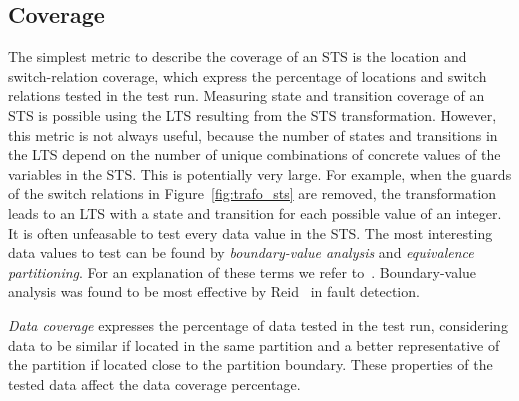 \subsection{Coverage}\label{sec:sts_coverage}
The simplest metric to describe the coverage of an STS is the location and switch-relation coverage, which express the percentage of locations and switch relations tested in the test run. Measuring state and transition coverage of an STS is possible using the LTS resulting from the STS transformation. However, this metric is not always useful, because the number of states and transitions in the LTS depend on the number of unique combinations of concrete values of the variables in the STS. This is potentially very large. For example, when the guards of the switch relations in Figure~\ref{fig:trafo_sts} are removed, the transformation leads to an LTS with a state and transition for each possible value of an integer. It is often unfeasable to test every data value in the STS. The most interesting data values to test can be found by \textit{boundary-value analysis} and \textit{equivalence partitioning}. For an explanation of these terms we refer to~\cite{Myers:2004}. Boundary-value analysis was found to be most effective by Reid~\cite{Reid:partitioning} in fault detection.

\textit{Data coverage} expresses the percentage of data tested in the test run, considering data to be similar if located in the same partition and a better representative of the partition if located close to the partition boundary. These properties of the tested data affect the data coverage percentage.
